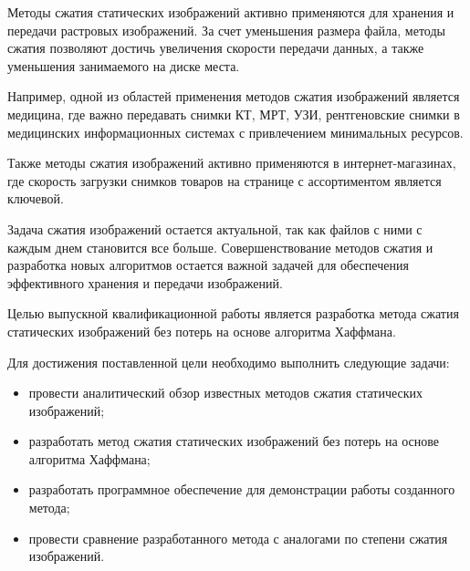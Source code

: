 \maketableofcontents

\intro

Методы сжатия статических изображений активно применяются для хранения и передачи растровых изображений. За счет уменьшения размера файла, методы сжатия позволяют достичь увеличения скорости передачи данных, а также уменьшения занимаемого на диске места.

Например, одной из областей применения методов сжатия изображений является медицина, где важно передавать снимки КТ, МРТ, УЗИ, рентгеновские снимки в медицинских информационных системах с привлечением минимальных ресурсов.

Также методы сжатия изображений активно применяются в интернет-магазинах, где скорость загрузки снимков товаров на странице с ассортиментом является ключевой.

Задача сжатия изображений остается актуальной, так как файлов с ними с каждым днем становится все больше. Совершенствование методов сжатия и разработка новых алгоритмов остается важной задачей для обеспечения эффективного хранения и передачи изображений.

Целью выпускной квалификационной работы является разработка метода сжатия статических изображений без потерь на основе алгоритма Хаффмана.

Для достижения поставленной цели необходимо выполнить следующие задачи:

\begin{itemize}
    \item провести аналитический обзор известных методов сжатия статических изображений;
    \item разработать метод сжатия статических изображений без потерь на основе алгоритма Хаффмана;
    \item разработать программное обеспечение для демонстрации работы созданного метода;
    \item провести сравнение разработанного метода с аналогами по степени сжатия изображений.
\end{itemize}
